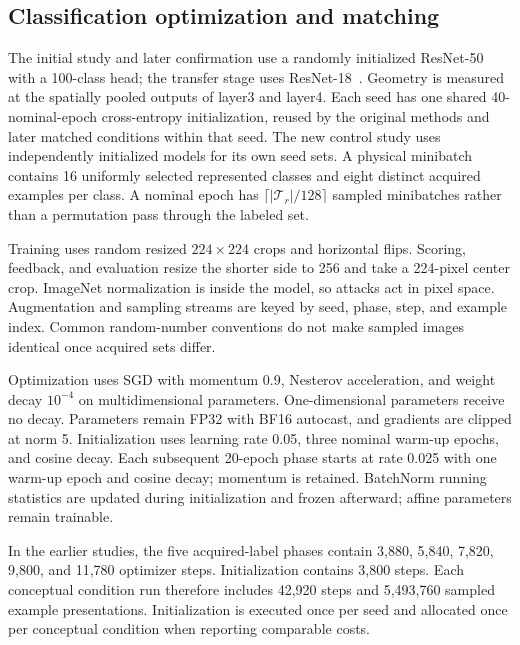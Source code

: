 \documentclass[10pt,a4paper,twocolumn]{article}
\begin{document}
\subsection{Classification optimization and matching}

The initial study and later confirmation use a randomly initialized
ResNet-50 with a 100-class head; the transfer stage uses ResNet-18~\cite{he2016deep}. Geometry is measured at the spatially pooled
outputs of layer3 and layer4. Each seed has one shared 40-nominal-epoch
cross-entropy initialization, reused by the original methods and
later matched conditions within that seed. The new control study
uses independently initialized models for its own seed sets.
A physical minibatch contains 16 uniformly selected represented
classes and eight distinct acquired examples per class.
A nominal epoch has $\lceil|\mathcal T_r|/128\rceil$ sampled
minibatches rather than a permutation pass through the labeled set.

Training uses random resized $224\times224$ crops and horizontal
flips. Scoring, feedback, and evaluation resize the shorter side to
256 and take a 224-pixel center crop. ImageNet normalization is
inside the model, so attacks act in pixel space.
Augmentation and sampling streams are keyed by seed, phase, step,
and example index. Common random-number conventions do not make
sampled images identical once acquired sets differ.

Optimization uses SGD with momentum 0.9, Nesterov acceleration,
and weight decay $10^{-4}$ on multidimensional parameters.
One-dimensional parameters receive no decay.
Parameters remain FP32 with BF16 autocast, and gradients are
clipped at norm 5. Initialization uses learning rate 0.05,
three nominal warm-up epochs, and cosine decay.
Each subsequent 20-epoch phase starts at rate 0.025 with one
warm-up epoch and cosine decay; momentum is retained.
BatchNorm running statistics are updated during initialization
and frozen afterward; affine parameters remain trainable.

In the earlier studies, the five acquired-label phases contain 3,880, 5,840, 7,820,
9,800, and 11,780 optimizer steps.
Initialization contains 3,800 steps.
Each conceptual condition run therefore includes 42,920 steps and
5,493,760 sampled example presentations. Initialization is executed
once per seed and allocated once per conceptual condition when
reporting comparable costs.
\end{document}
